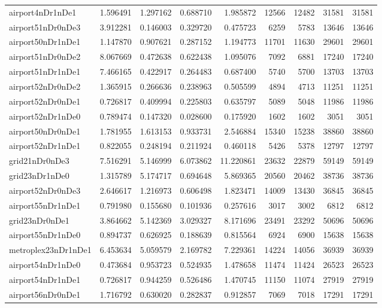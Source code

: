 \begin{longtable}{|l|r|r|r|r|r|r|r|r|}
airport4nDr1nDe1 & 1.596491 & 1.297162 & 0.688710 & 1.985872 & 12566 & 12482 & 31581 & 31581 \\
airport51nDr0nDe3 & 3.912281 & 0.146003 & 0.329720 & 0.475723 & 6259 & 5783 & 13646 & 13646 \\
airport50nDr1nDe1 & 1.147870 & 0.907621 & 0.287152 & 1.194773 & 11701 & 11630 & 29601 & 29601 \\
airport51nDr0nDe2 & 8.067669 & 0.472638 & 0.622438 & 1.095076 & 7092 & 6881 & 17240 & 17240 \\
airport51nDr1nDe1 & 7.466165 & 0.422917 & 0.264483 & 0.687400 & 5740 & 5700 & 13703 & 13703 \\
airport52nDr0nDe2 & 1.365915 & 0.266636 & 0.238963 & 0.505599 & 4894 & 4713 & 11251 & 11251 \\
airport52nDr0nDe1 & 0.726817 & 0.409994 & 0.225803 & 0.635797 & 5089 & 5048 & 11986 & 11986 \\
airport52nDr1nDe0 & 0.789474 & 0.147320 & 0.028600 & 0.175920 & 1602 & 1602 & 3051 & 3051 \\
airport50nDr0nDe1 & 1.781955 & 1.613153 & 0.933731 & 2.546884 & 15340 & 15238 & 38860 & 38860 \\
airport52nDr1nDe1 & 0.822055 & 0.248194 & 0.211924 & 0.460118 & 5426 & 5378 & 12797 & 12797 \\
grid21nDr0nDe3 & 7.516291 & 5.146999 & 6.073862 & 11.220861 & 23632 & 22879 & 59149 & 59149 \\
grid23nDr1nDe0 & 1.315789 & 5.174717 & 0.694648 & 5.869365 & 20560 & 20462 & 38736 & 38736 \\
airport52nDr0nDe3 & 2.646617 & 1.216973 & 0.606498 & 1.823471 & 14009 & 13430 & 36845 & 36845 \\
airport55nDr1nDe1 & 0.791980 & 0.155680 & 0.101936 & 0.257616 & 3017 & 3002 & 6812 & 6812 \\
grid23nDr0nDe1 & 3.864662 & 5.142369 & 3.029327 & 8.171696 & 23491 & 23292 & 50696 & 50696 \\
airport55nDr1nDe0 & 0.894737 & 0.626925 & 0.188639 & 0.815564 & 6924 & 6900 & 15638 & 15638 \\
metroplex23nDr1nDe1 & 6.453634 & 5.059579 & 2.169782 & 7.229361 & 14224 & 14056 & 36939 & 36939 \\
airport54nDr1nDe0 & 0.473684 & 0.953723 & 0.524935 & 1.478658 & 11474 & 11424 & 26523 & 26523 \\
airport54nDr1nDe1 & 0.726817 & 0.944259 & 0.526486 & 1.470745 & 11150 & 11074 & 27919 & 27919 \\
airport56nDr0nDe1 & 1.716792 & 0.630020 & 0.282837 & 0.912857 & 7069 & 7018 & 17291 & 17291 \\

\end{longtable}
